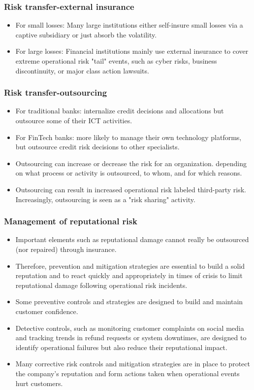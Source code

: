 \subsubsection{Risk transfer-external insurance}
\begin{itemize}
\item For small losses: Many large institutions either self-insure small losses via a captive subsidiary or just absorb the volatility.
\item  For large losses: Financial institutions mainly use external insurance to cover extreme operational risk "tail" events, such as cyber risks, business discontinuity, or major class action lawsuits.

\end{itemize}


\subsubsection{Risk transfer-outsourcing }
\begin{itemize}
\item For traditional banks: internalize credit decisions and allocations but outsource some of their ICT activities.
\item  For FinTech banks: more likely to manage their own technology platforms, but outsource credit risk decisions to other specialists.
\item Outsourcing can increase or decrease the risk for an organization. depending on what process or activity is outsourced, to whom, and for which reasons.
\item  Outsourcing can result in increased operational risk labeled third-party risk. Increasingly, outsourcing is seen as a "risk sharing" activity.
\end{itemize}



\subsubsection{Management of reputational risk}
\begin{itemize}
\item Important elements such as reputational damage cannot really be outsourced (nor repaired) through insurance.
\item Therefore, prevention and mitigation strategies are essential to build a solid reputation and to react quickly and appropriately in times of crisis to limit reputational damage following operational risk incidents.
\item Some preventive controls and strategies are designed to build and maintain customer confidence.
\item Detective controls, such as monitoring customer complaints on social media and tracking trends in refund requests or system downtimes, are designed to identify operational failures but also reduce their reputational impact.
\item Many corrective risk controls and mitigation strategies are in place to protect the company's reputation and form actions taken when operational events hurt customers.
\end{itemize}



